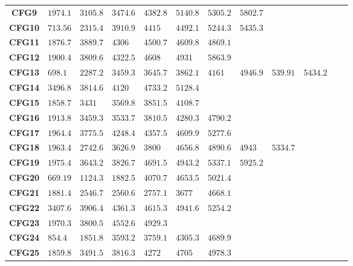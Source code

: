 \documentclass[final,1p]{elsarticle}
\begin{document}
\begin{table}[h!]
\begin{tabularx}{20cm}{c*{11}{X}}
\textbf{CFG9}					&$1974.1$ 			&$3105.8$ 			&$3474.6$ 		&$4382.8$ 		&$5140.8$ 		&$5305.2$ 		&$5802.7$ 		&						&						&						&					\\
\textbf{CFG10}				&$713.56$ 			&$2315.4$ 			&$3910.9$ 		&$4415$ 			&$4492.1$ 		&$5244.3$ 		&$5435.3$ 		&						&						&						&					\\
\textbf{CFG11}				&$1876.7$ 			&$3889.7$ 			&$4306	$ 			&$4500.7$ 		&$4609.8$ 		&$4869.1$ 		&						&						&						&						&					\\
\textbf{CFG12}				&$1900.4$ 			&$3809.6$ 			&$4322.5$ 		&$4608$ 			&$4931$ 			&$5863.9$ 		&						&						&						&						&					\\
\textbf{CFG13}				&$698.1$ 				&$2287.2$ 			&$3459.3$ 		&$3645.7$ 		&$3862.1$ 		&$4161	$ 			&$4946.9$ 		&$539.91$ 		&$5434.2$ 		&						&					\\
\textbf{CFG14}				&$3496.8$ 			&$3814.6$ 			&$4120	$ 			&$4733.2$ 		&$5128.4$ 		&						&						&						&						&						&					\\
\textbf{CFG15}				&$1858.7$ 			&$3431$ 				&$3569.8$ 		&$3851.5$ 		&$4108.7$ 		&						&						&						&						&						&					\\
\textbf{CFG16}				&$1913.8$ 			&$3459.3$ 			&$3533.7$ 		&$3810.5$ 		&$4280.3$ 		&$4790.2$ 		&						&						&						&						&					\\
\textbf{CFG17}				&$1964.4$ 			&$3775.5$ 			&$4248.4$ 		&$4357.5$ 		&$4609.9$ 		&$5277.6$ 		&						&						&						&						&					\\
\textbf{CFG18}				&$1963.4$ 			&$2742.6$ 			&$3626.9$ 		&$3800	$ 			&$4656.8$ 		&$4890.6$ 		&$4943	$ 			&$5334.7$ 		&						&						&					\\		
\textbf{CFG19}				&$1975.4$ 			&$3643.2$ 			&$3826.7$ 		&$4691.5$ 		&$4943.2$ 		&$5337.1$ 		&$5925.2$ 		&						&						&						&					\\
\textbf{CFG20}				&$669.19$ 			&$1124.3$ 			&$1882.5$ 		&$4070.7$ 		&$4653.5$ 		&$5021.4$ 		&						&						&						&						&					\\
\textbf{CFG21}				&$1881.4$ 			&$2546.7$ 			&$2560.6$ 		&$2757.1$ 		&$3677	$ 			&$4668.1$ 		&						&						&						&						&					\\
\textbf{CFG22}				&$3407.6$ 			&$3906.4$ 			&$4361.3$ 		&$4615.3$ 		&$4941.6$ 		&$5254.2$ 		&						&						&						&						&					\\
\textbf{CFG23}				&$1970.3$ 			&$3800.5$ 			&$4552.6$ 		&$4929.3$ 		&						&						&						&						&						&						&					\\
\textbf{CFG24}				&$854.4$ 				&$1851.8$ 			&$3593.2$ 		&$3759.1$ 		&$4305.3$ 		&$4689.9$ 		&						&						&						&						&					\\
\textbf{CFG25}				&$1859.8$ 			&$3491.5$ 			&$3816.3$ 		&$4272	$ 			&$4705	$ 			&$4978.3$ 		&						&						&						&						&					\\
\bottomrule
\end{tabularx}\hspace*{-2cm}
\normalsize
\label{tab:FreqIns25CFG}
\end{table}
\end{document}
